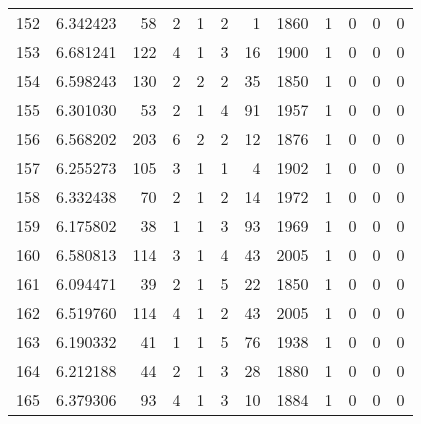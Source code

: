 \begin{tabular}{lrrrrrrrrrrr}
152 &  6.342423 &   58 &      2 &        1 &      2 &               1 &  1860 &               1 &               0 &               0 &               0 \\
153 &  6.681241 &  122 &      4 &        1 &      3 &              16 &  1900 &               1 &               0 &               0 &               0 \\
154 &  6.598243 &  130 &      2 &        2 &      2 &              35 &  1850 &               1 &               0 &               0 &               0 \\
155 &  6.301030 &   53 &      2 &        1 &      4 &              91 &  1957 &               1 &               0 &               0 &               0 \\
156 &  6.568202 &  203 &      6 &        2 &      2 &              12 &  1876 &               1 &               0 &               0 &               0 \\
157 &  6.255273 &  105 &      3 &        1 &      1 &               4 &  1902 &               1 &               0 &               0 &               0 \\
158 &  6.332438 &   70 &      2 &        1 &      2 &              14 &  1972 &               1 &               0 &               0 &               0 \\
159 &  6.175802 &   38 &      1 &        1 &      3 &              93 &  1969 &               1 &               0 &               0 &               0 \\
160 &  6.580813 &  114 &      3 &        1 &      4 &              43 &  2005 &               1 &               0 &               0 &               0 \\
161 &  6.094471 &   39 &      2 &        1 &      5 &              22 &  1850 &               1 &               0 &               0 &               0 \\
162 &  6.519760 &  114 &      4 &        1 &      2 &              43 &  2005 &               1 &               0 &               0 &               0 \\
163 &  6.190332 &   41 &      1 &        1 &      5 &              76 &  1938 &               1 &               0 &               0 &               0 \\
164 &  6.212188 &   44 &      2 &        1 &      3 &              28 &  1880 &               1 &               0 &               0 &               0 \\
165 &  6.379306 &   93 &      4 &        1 &      3 &              10 &  1884 &               1 &               0 &               0 &               0 \\

\end{tabular}
